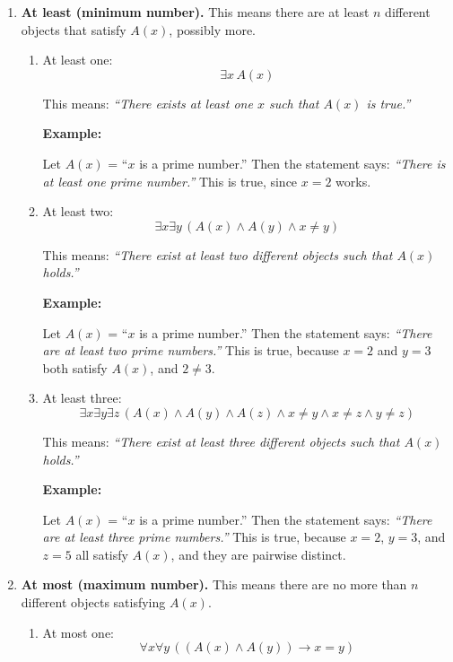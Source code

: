 \documentclass[12pt,a4paper,openany]{article}
\begin{document}
\begin{enumerate}
\item
\textbf{At least (minimum number).} This means there are at least \(n\)
different objects that satisfy \(A(x)\), possibly more.

\begin{enumerate}
\item
At least one:
\[
\exists x \, A(x)
\]

This means: \emph{``There exists at least one \(x\) such that \(A(x)\)
is true.''}

\textbf{Example:}

Let \(A(x)\) = ``\(x\) is a prime number.'' Then the statement says:
\emph{``There is at least one prime number.''} This is true, since
\(x = 2\) works.

\item
At least two:
\[
\exists x \exists y \, (A(x) \land A(y) \land x \neq y)
\]

This means: \emph{``There exist at least two different objects such
that \(A(x)\) holds.''}

\textbf{Example:}

Let \(A(x)\) = ``\(x\) is a prime number.'' Then the statement says:
\emph{``There are at least two prime numbers.''} This is true, because
\(x = 2\) and \(y = 3\) both satisfy \(A(x)\), and \(2 \neq 3\).

\item
At least three:
\[
\exists x \exists y \exists z \, (A(x) \land A(y) \land A(z) \land x \neq y \land x \neq z \land y \neq z)
\]

This means: \emph{``There exist at least three different objects such
that \(A(x)\) holds.''}

\textbf{Example:} 

Let \(A(x)\) = ``\(x\) is a prime number.'' Then the
statement says: \emph{``There are at least three prime numbers.''}
This is true, because \(x = 2\), \(y = 3\), and \(z = 5\) all satisfy
\(A(x)\), and they are pairwise distinct.
\end{enumerate}

\item
\textbf{At most (maximum number).} This means there are no more than \(n\)
different objects satisfying \(A(x)\).

\begin{enumerate}
\item
At most one:
\[
\forall x \forall y \, ((A(x) \land A(y)) \rightarrow x = y)
\]


\end{enumerate}
\end{enumerate}
\end{document}
